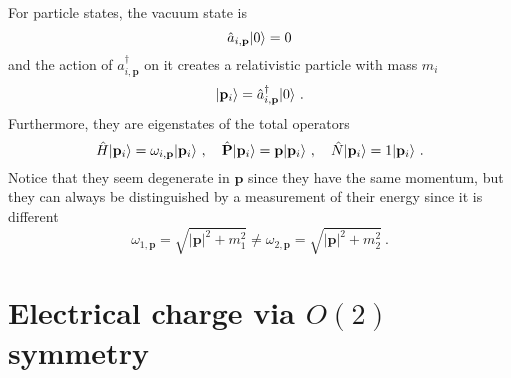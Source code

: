     For particle states, the vacuum state is 
    \begin{equation*}
        \hat a_{i, \mathbf p} \vert0\rangle = 0 
    \end{equation*} 
    and the action of $\hat a_{i, \mathbf p}^\dagger$ on it creates a relativistic particle with mass $m_i$ 
    \begin{equation*}
        \vert\mathbf p_i\rangle = \hat a_{i, \mathbf p}^\dagger \vert0\rangle ~.
    \end{equation*}
    Furthermore, they are eigenstates of the total operators  
    \begin{equation*}
        \hat H \vert\mathbf p_i\rangle = \omega_{i, \mathbf p} \vert\mathbf p_i\rangle ~, \quad \hat{\mathbf P} \vert\mathbf p_i\rangle = \mathbf p \vert\mathbf p_i\rangle ~, \quad \hat N \vert\mathbf p_i\rangle = 1 \vert\mathbf p_i\rangle ~.
    \end{equation*}
    Notice that they seem degenerate in $\mathbf p$ since they have the same momentum, but they can always be distinguished by a measurement of their energy since it is different
    \begin{equation*}
        \omega_{1, \mathbf p} = \sqrt{|\mathbf p|^2 + m_1^2} \neq \omega_{2, \mathbf p} = \sqrt{|\mathbf p|^2 + m_2^2} ~.
    \end{equation*}

\section{Electrical charge via $O(2)$ symmetry}

